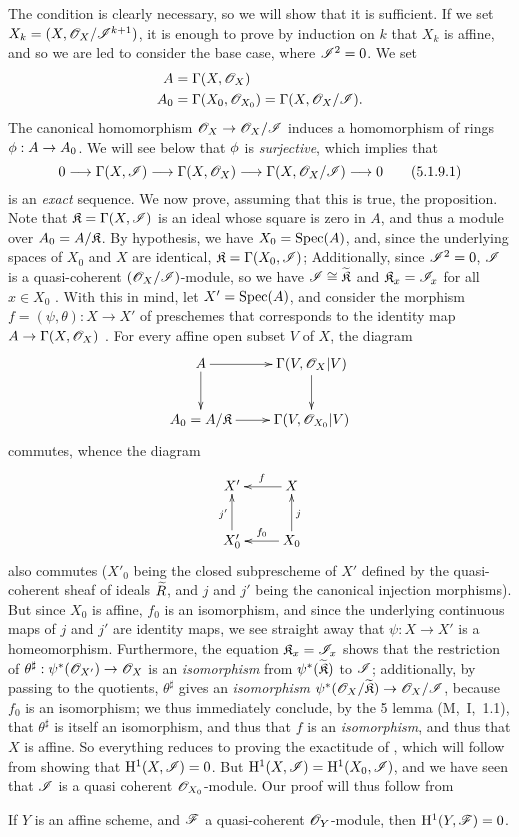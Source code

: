 The condition is clearly necessary, so we will show that it is sufficient.
If we set $X_k=(X,\mathscr{O}_X/\mathscr{I}^{k+1})$, it is enough to prove by induction on $k$ that $X_k$ is affine, and so we are led to consider the base case, where $\mathscr{I}^2=0$.
We set
\begin{align*}
  A&=\Gamma(X,\mathscr{O}_X)\\
  A_0&=\Gamma(X_0,\mathscr{O}_{X_0})=\Gamma(X,\mathscr{O}_X/\mathscr{I}).
\end{align*}
The canonical homomorphism $\OO_X\to\OO_X/\sh{I}$ induces a homomorphism of rings $\vphi:A\to A_0$.
We will see below that $\phi$ is \emph{surjective}, which implies that
\begin{equation*}
\label{1.5.1.9.1}
  0\to\Gamma(X,\sh{I})\to\Gamma(X,\OO_X)\to\Gamma(X,\OO_X/\sh{I})\to 0\tag{5.1.9.1}
\end{equation*}
is an \emph{exact} sequence.
We now prove, assuming that this is true, the proposition.
Note that $\mathfrak{K}=\Gamma(X,\mathscr{I})$ is an ideal whose square is zero in $A$, and thus a module over $A_0=A/\mathfrak{K}$.
By hypothesis, we have $X_0={\mathop{\mathrm{Spec}}\nolimits}(A)$, and, since the underlying spaces of $X_0$ and $X$ are identical, $\mathfrak{K}=\Gamma(X_0,\mathscr{I})$;
Additionally, since $\mathscr{I}^2=0$, $\mathscr{I}$ is a quasi-coherent $(\mathscr{O}_X/\mathscr{I})$-module, so we have $\mathscr{I}\cong{\widetilde{\mathfrak{K}}}$ and $\mathfrak{K}_x=\mathscr{I}_x$ for all $x\in X_0$ .
With this in mind, let $X'={\mathop{\mathrm{Spec}}\nolimits}(A)$, and consider the morphism $f=(\psi,\theta):X\to X'$ of preschemes that corresponds to the identity map $A\to\Gamma(X,\OO_X)$ .
For every affine open subset $V$ of $X$, the diagram
\[
  \xymatrix{
    A\ar[r]\ar[d] &
    \Gamma(V,\OO_X|V)\ar[d]\\
    A_0=A/\fk{K}\ar[r] &
    \Gamma(V,\OO_{X_0}|V)
  }
\]
commutes, whence the diagram
\[
  \xymatrix{
    X' &
    X\ar[l]_f\\
    X'_0\ar[u]^{j'} &
    X_0\ar[l]_{f_0}\ar[u]_j
  }
\]
also commutes ($X'_0$ being the closed subprescheme of $X'$ defined by the quasi-coherent sheaf of ideals ${\widetilde{R}}$, and $j$ and $j'$ being the canonical injection morphisms).
But since $X_0$ is affine, $f_0$ is an isomorphism, and since the underlying continuous maps of $j$ and $j'$ are identity maps, we see straight away that $\psi:X\to X'$ is a homeomorphism.
Furthermore, the equation $\mathfrak{K}_x=\mathscr{I}_x$ shows that the restriction of $\theta^\sharp:\psi^*(\OO_{X'})\to\OO_X$ is an \emph{isomorphism} from $\psi^*({\widetilde{\mathfrak{K}}})$ to $\mathscr{I}$;
additionally, by passing to the quotients, $\theta^\sharp$ gives an \emph{isomorphism} $\psi^*(\OO_X/\wt{\fk{K}})\to\OO_X/\sh{I}$, because $f_0$ is an isomorphism;
we thus immediately conclude, by the 5 lemma (M,~I,~1.1), that $\theta^\sharp$ is itself an isomorphism, and thus that $f$ is an \emph{isomorphism}, and thus that $X$ is affine.
So everything reduces to proving the exactitude of , which will follow from showing that $\mathrm{H}^1(X,\mathscr{I})=0$.
But $\mathrm{H}^1(X,\mathscr{I})=\mathrm{H}^1(X_0,\mathscr{I})$, and we have seen that $\mathscr{I}$ is a quasi coherent $\mathscr{O}_{X_0}$-module.
Our proof will thus follow from
\begin{lem}[5.1.9.2]
\label{1.5.1.9.2}
If $Y$ is an affine scheme, and $\mathscr{F}$ a quasi-coherent $\mathscr{O}_Y$-module, then $\mathrm{H}^1(Y,\mathscr{F})=0$.
\end{lem}

